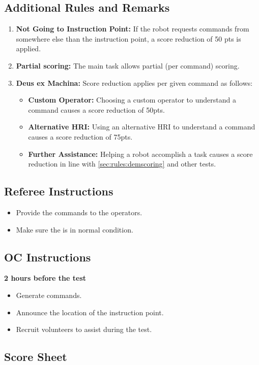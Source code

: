 %
%
\subsection*{Additional Rules and Remarks}
\begin{enumerate}[nosep]
	\item \textbf{Not Going to Instruction Point:} If the robot requests commands from somewhere else than the instruction point, a score reduction of 50 pts is applied.
	
	\item \textbf{Partial scoring:} The main task allows partial (per command) scoring.
		
	\item \textbf{Deus ex Machina:} Score reduction applies per given command as follows:
	\begin{itemize}[nosep]
		\item \textbf{Custom Operator:} Choosing a custom operator to understand a command causes a score reduction of 50pts.
		\item \textbf{Alternative HRI:} Using an alternative HRI to understand a command causes a score reduction of 75pts.
		\item \textbf{Further Assistance:} Helping a robot accomplish a task causes a score reduction in line with \ref{sec:rules:demscoring} and other \SONE{} tests.
	\end{itemize}
\end{enumerate}

\newpage

\subsection*{Referee Instructions}
\begin{itemize}[nosep]
	\item Provide the commands to the operators.
	\item Make sure the \Arena{} is in normal condition.
\end{itemize}


\subsection*{OC Instructions}
\textbf{2 hours before the test}
\begin{itemize}[nosep]
 	\item Generate commands.
	\item Announce the location of the instruction point.
	\item Recruit volunteers to assist during the test.
\end{itemize}


\subsection*{Score Sheet}


